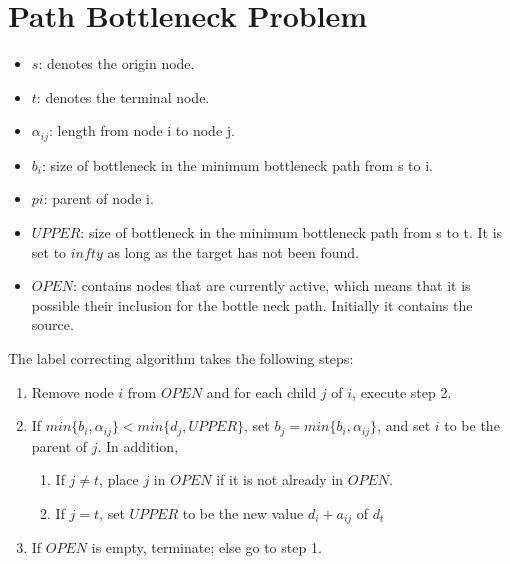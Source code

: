 \documentclass[11pt, oneside]{article}   	%
\begin{document}
\section{Path Bottleneck Problem}

\begin{itemize}
	\item $s$: denotes the origin node.
	\item $t$: denotes the terminal node.
	\item $\alpha_{ij}$: length from node i to node j.
	\item $b_{i}$: size of bottleneck in the minimum bottleneck path from s to i.
	\item $p{i}$: parent of node i.
	\item $UPPER$: size of bottleneck in the minimum bottleneck path from s to t. It is set to $infty$ as long as the target has not been found.
	\item $OPEN$: contains nodes that are currently active, which means that it is possible their inclusion for the bottle neck path. Initially it contains the source.
\end{itemize}
The label correcting algorithm takes the following steps:
\begin{enumerate}
	\item Remove node $i$ from $OPEN$ and for each child $j$ of $i$, execute step 2.
	\item If $min\{b_{i},\alpha_{ij}\} < min\{d_{j},UPPER\}$, set $b_{j}=min\{b_{i},\alpha_{ij}\}$, and set $i$ to be the parent of $j$. In addition,
	\begin{enumerate}
		\item If $j \neq t$, place $j$ in $OPEN$ if it is not already in $OPEN$.
		\item If $j = t$, set $UPPER$ to be the new value $d_{i}+a_{ij}$ of $d_{t}$
	\end{enumerate}
	\item If $OPEN$ is empty, terminate; else go to step 1.
\end{enumerate}



\end{document}
